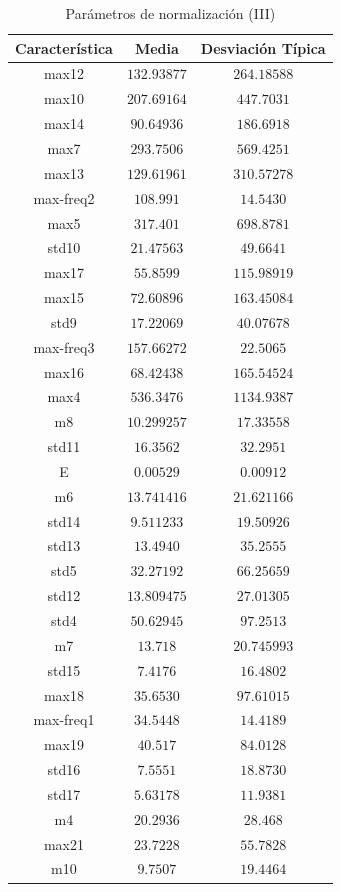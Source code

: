 \documentclass[12pt]{article}
\begin{document}
\begin{table}
	\caption{Parámetros de normalización (III)}
	\centering
		\begin{tabular}{||c c c||}
			\hline
			Característica & Media & Desviación Típica  \\ [0.5ex]
			\hline\hline
			max12 & $132.93877$ & $264.18588$ \\
			\hline
			max10 & $207.69164$ & $447.7031$ \\
			\hline
			max14 & $90.64936$ & $186.6918$ \\
			\hline
			max7 & $293.7506$ & $569.4251$ \\
			\hline
			max13 & $129.61961$ & $310.57278$ \\
			\hline
			max-freq2 & $108.991$ & $14.5430$ \\
			\hline
			max5 & $317.401$ & $698.8781$ \\
			\hline
			std10 & $21.47563$ & $49.6641$ \\
			\hline
			max17 & $55.8599$ & $115.98919$ \\
			\hline
			max15 & $72.60896$ & $163.45084$ \\
			\hline
			std9 & $17.22069$ & $40.07678$ \\
			\hline
			max-freq3 & $157.66272$ & $22.5065$ \\
			\hline
			max16 & $68.42438$ & $165.54524$ \\
			\hline
			max4 & $536.3476$ & $1134.9387$ \\
			\hline
			m8 & $10.299257$ & $17.33558$ \\
			\hline
			std11 & $16.3562$ & $32.2951$ \\
			\hline
			E & $0.00529$ & $0.00912$ \\
			\hline
			m6 & $13.741416$ & $21.621166$ \\
			\hline
			std14 & $9.511233$ & $19.50926$ \\
			\hline
			std13 & $13.4940$ & $35.2555$ \\
			\hline
			std5 & $32.27192$ & $66.25659$ \\
			\hline
			std12 & $13.809475$ & $27.01305$ \\
			\hline
			std4 & $50.62945$ & $97.2513$ \\
			\hline
			m7 & $13.718$ & $20.745993$ \\
			\hline
			std15 & $7.4176$ & $16.4802$ \\
			\hline
			max18 & $35.6530$ & $97.61015$ \\
			\hline
			max-freq1 & $34.5448$ & $14.4189$ \\
			\hline
			max19 & $40.517$ & $84.0128$ \\
			\hline
			std16 & $7.5551$ & $18.8730$ \\
			\hline
			std17 & $5.63178$ & $11.9381$ \\
			\hline
			m4 & $20.2936$ & $28.468$ \\
			\hline
			max21 & $23.7228$ & $55.7828$ \\
			\hline
			m10 & $9.7507$ & $19.4464$ \\
			\hline
		\end{tabular}
	\label{Tab:Features_5_3}
\end{table}
\end{document}
